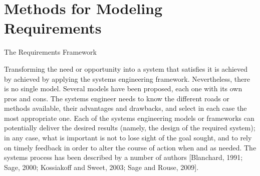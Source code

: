 \section{Methods for Modeling Requirements}


The Requirements Framework

Transforming the need or opportunity into a system that satisfies it is achieved by achieved by applying the systems engineering framework. Nevertheless, there is no single model. Several models have been proposed, each one with its own pros and cons. The systems engineer needs to know the different roads or methods available, their advantages and drawbacks, and select in each case the most appropriate one. Each of the systems engineering models or frameworks can potentially deliver the desired results (namely, the design of the required system); in any case, what is important is not to lose sight of the goal sought, and to rely on timely feedback in order to alter the course of action when and as needed. The systems process has been described by a number of authors [Blanchard, 1991; Sage, 2000; Kossiakoff and Sweet, 2003; Sage and Rouse, 2009].


